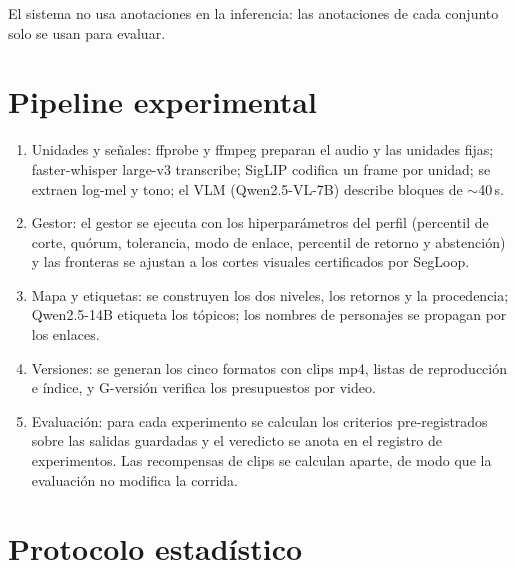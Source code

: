 El sistema no usa anotaciones en la inferencia: las anotaciones de cada conjunto solo se
usan para evaluar.

\section{Pipeline experimental}

\begin{enumerate}
  \item Unidades y señales: ffprobe y ffmpeg preparan el audio y las unidades fijas;
        faster-whisper large-v3 transcribe; SigLIP codifica un frame por unidad; se extraen
        log-mel y tono; el VLM (Qwen2.5-VL-7B) describe bloques de $\sim$40\,s.
  \item Gestor: el gestor se ejecuta con los hiperparámetros del perfil
        (percentil de corte, quórum, tolerancia, modo de enlace, percentil de retorno y
        abstención) y las fronteras se ajustan a los cortes visuales certificados por
        SegLoop.
  \item Mapa y etiquetas: se construyen los dos niveles, los retornos y la
        procedencia; Qwen2.5-14B etiqueta los tópicos; los nombres de personajes se propagan
        por los enlaces.
  \item Versiones: se generan los cinco formatos con clips mp4, listas de
        reproducción e índice, y G-versión verifica los presupuestos por video.
  \item Evaluación: para cada experimento se calculan los criterios pre-registrados sobre
        las salidas guardadas y el veredicto se anota en el registro de experimentos. Las
        recompensas de clips se calculan aparte, de modo que la evaluación no modifica la
        corrida.
\end{enumerate}

\section{Protocolo estadístico}


